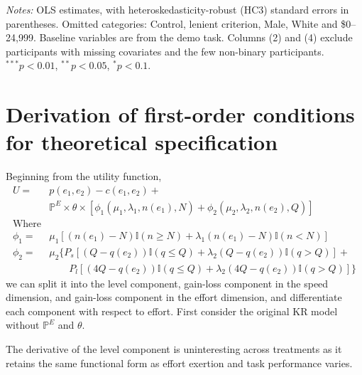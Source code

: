 \documentclass[12pt, letterpaper]{article}
\begin{document}
\begin{table}[p]
\centering
\begin{threeparttable}
\scriptsize\renewcommand{\arraystretch}{0.85}

\begin{tablenotes}[flushleft]
\scriptsize
\item \textit{Notes:} OLS estimates, with heteroskedasticity-robust (HC3) standard errors in parentheses. Omitted categories: Control, lenient criterion, Male, White and \$0--24,999. Baseline variables are from the demo task. Columns (2) and (4) exclude participants with missing covariates and the few non-binary participants. $^{***}p<0.01$, $^{**}p<0.05$, $^{*}p<0.1$.
\end{tablenotes}
\end{threeparttable}
\caption{Treatment effects on sets completed (class sample)}\label{tab:reg-sets-class}
\end{table}

\section{Derivation of first-order conditions for theoretical specification}\label{app:derivation}

Beginning from the utility function,
\[
\begin{aligned}
U = & p(e_1, e_2) - c(e_1, e_2) + \\
    & \mathbb{P}^E \times \theta \times [\phi_1(\mu_1, \lambda_1, n(e_1), N) + \phi_2(\mu_2, \lambda_2, n(e_2), Q)] \\
\text{Where}
\\
\phi_1 = & \mu_1[(n(e_1)-N)\mathbb{I}(n \geq N) + \lambda_1(n(e_1)-N)\mathbb{I}(n<N)] \\
\phi_2 = & \mu_2 \{P_s[(Q-q(e_2))\mathbb{I}(q \leq Q) + \lambda_2(Q-q(e_2))\mathbb{I}(q>Q)] + \\
& \qquad P_l[(4Q-q(e_2))\mathbb{I}(q \leq Q) + \lambda_2(4Q-q(e_2))\mathbb{I}(q>Q)]\}
\end{aligned}
\]
we can split it into the level component, gain-loss component in the speed dimension, and gain-loss component in the effort dimension, and differentiate each component with respect to effort. First consider the original KR model without $\mathbb{P}^E$ and $\theta$.

The derivative of the level component is uninteresting across treatments as it retains the same functional form as effort exertion and task performance varies.
\end{document}
